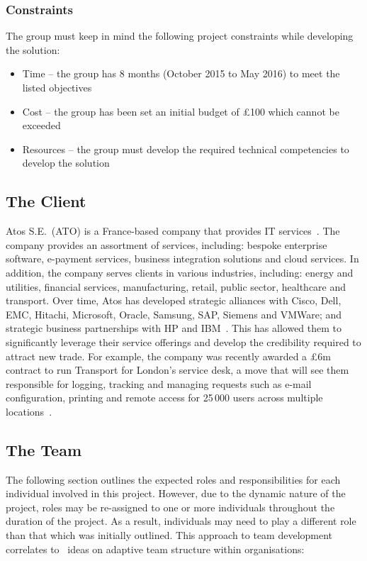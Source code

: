 \subsubsection{Constraints}

The group must keep in mind the following project constraints while developing the solution:

\begin{itemize}
	\item Time -- the group has 8 months (October 2015 to May 2016) to meet the listed objectives
	\item Cost -- the group has been set an initial budget of \pounds 100 which cannot be exceeded
	\item Resources -- the group must develop the required technical competencies to develop the solution
\end{itemize}

\subsection{The Client}

Atos S.E.~(ATO) is a France-based company that provides IT services~\parencite{web:reuters}. The company provides an assortment of services, including: bespoke enterprise software, e-payment services, business integration solutions and cloud services. In addition, the company serves clients in various industries, including: energy and utilities, financial services, manufacturing, retail, public sector, healthcare and transport. Over time, Atos has developed strategic alliances with Cisco, Dell, EMC, Hitachi, Microsoft, Oracle, Samsung, SAP, Siemens and VMWare; and strategic business partnerships with HP and IBM~\parencite{web:bloomberg}. This has allowed them to significantly leverage their service offerings and develop the credibility required to attract new trade. For example, the company was recently awarded a \pounds 6m contract to run Transport for London's service desk, a move that will see them responsible for logging, tracking and managing requests such as e-mail configuration, printing and remote access for 25\,000 users across multiple locations~\parencite{web:jee}.

\subsection{The Team}

The following section outlines the expected roles and responsibilities for each individual involved in this project. However, due to the dynamic nature of the project, roles may be re-assigned to one or more individuals throughout the duration of the project. As a result, individuals may need to play a different role than that which was initially outlined. This approach to team development correlates to~\textcite{book:xteams} ideas on adaptive team structure within organisations:

